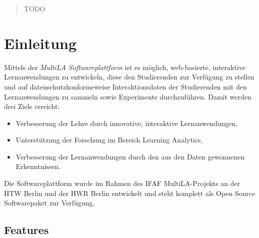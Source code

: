 \documentclass[a0,portrait]{a0poster}
\begin{document}
\begin{multicols}{2} %


\color{Navy} %

\begin{abstract}

TODO

\end{abstract}


\color{DarkSlateGray} %

\section*{Einleitung}

Mittels der \textit{MultiLA Softwareplattform} ist es möglich, web-basierte, interaktive Lernanwendungen zu entwickeln, diese den Studierenden zur Verfügung zu stellen und auf datenschutzkonformeweise Interaktionsdaten der Studierenden mit den Lernanwendungen zu sammeln sowie Experimente durchzuführen. Damit werden drei Ziele erreicht:

\begin{itemize}
    \item Verbesserung der Lehre durch innovative, interaktive Lernanwendungen,
    \item Unterstützung der Forschung im Bereich Learning Analytics,
    \item Verbesserung der Lernanwendungen durch den aus den Daten gewonnenen Erkenntnissen.
\end{itemize}

Die Softwareplattform wurde im Rahmen des IFAF MultiLA-Projekts an der HTW Berlin und der HWR Berlin entwickelt und steht komplett als Open Source Softwarepaket zur Verfügung.

\subsection*{Features}


\end{multicols}
\end{document}
